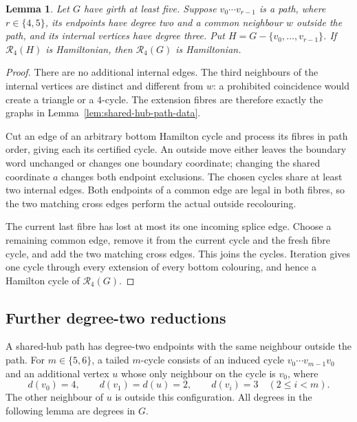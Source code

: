 \documentclass[11pt]{article}
\newtheorem{lemma}[theorem]{Lemma}
\theoremstyle{remark}
\newcommand{\R}{\mathcal R}
\numberwithin{equation}{section}
\numberwithin{table}{section}
\begin{document}
\begin{lemma}\label{lem:shared-hub-paths}
Let $G$ have girth at least five. Suppose $v_0\cdots v_{r-1}$ is a path,
where $r\in\{4,5\}$, its endpoints have degree two and a common neighbour
$w$ outside the path, and its internal vertices have degree three.
Put $H=G-\{v_0,\ldots,v_{r-1}\}$. If $\R_4(H)$ is Hamiltonian,
then $\R_4(G)$ is Hamiltonian.
\end{lemma}
\begin{proof}
There are no additional internal edges. The third neighbours of the internal
vertices are distinct and different from $w$: a prohibited coincidence
would create a triangle or a $4$-cycle. The extension fibres are therefore
exactly the graphs in Lemma~\ref{lem:shared-hub-path-data}.

Cut an edge of an arbitrary bottom Hamilton cycle and process its fibres in
path order, giving each its certified cycle. An outside move either leaves
the boundary word unchanged or changes one boundary coordinate; changing the
shared coordinate $a$ changes both endpoint exclusions. The chosen cycles
share at least two internal edges. Both endpoints of a common edge are legal
in both fibres, so the two matching cross edges perform the actual outside
recolouring.

The current last fibre has lost at most its one incoming splice edge.
Choose a remaining common edge, remove it from the current cycle and the
fresh fibre cycle, and add the two matching cross edges. This joins the
cycles. Iteration gives one cycle through every extension of every bottom
colouring, and hence a Hamilton cycle of $\R_4(G)$.
\end{proof}

\subsection{Further degree-two reductions}

A shared-hub path has degree-two endpoints with the same neighbour outside
the path. For $m\in\{5,6\}$, a tailed $m$-cycle consists of an induced
cycle $v_0\cdots v_{m-1}v_0$ and an additional vertex $u$ whose only
neighbour on the cycle is $v_0$, where
\[
 d(v_0)=4,\qquad d(v_1)=d(u)=2,\qquad
 d(v_i)=3\quad(2\le i<m).
\]
The other neighbour of $u$ is outside this configuration. All degrees
in the following lemma are degrees in $G$.
\end{document}
